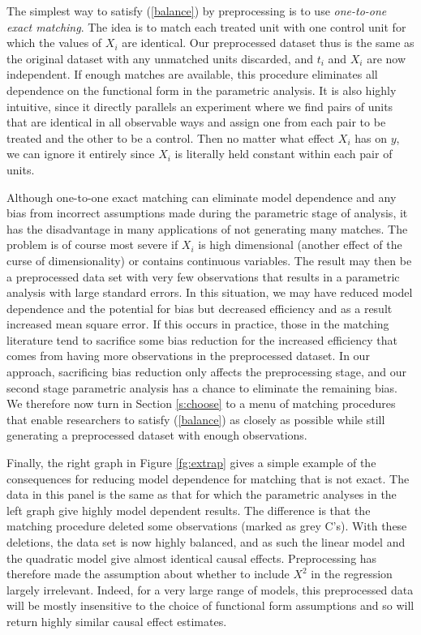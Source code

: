 \documentclass[11pt,titlepage]{article}
\begin{document}
The simplest way to satisfy (\ref{balance}) by preprocessing is to use
\emph{one-to-one exact matching}.  The idea is to match each treated
unit with one control unit for which the values of $X_i$ are
identical.  Our preprocessed dataset thus is the same as the original
dataset with any unmatched units discarded, and $t_i$ and $X_i$ are
now independent.  If enough matches are available, this procedure
eliminates all dependence on the functional form in the parametric
analysis.  It is also highly intuitive, since it directly parallels an
experiment where we find pairs of units that are identical in all
observable ways and assign one from each pair to be treated and the
other to be a control.  Then no matter what effect $X_i$ has on $y$,
we can ignore it entirely since $X_i$ is literally held constant
within each pair of units.

Although one-to-one exact matching can eliminate model dependence and
any bias from incorrect assumptions made during the parametric stage
of analysis, it has the disadvantage in many applications of not
generating many matches.  The problem is of course most severe if
$X_i$ is high dimensional (another effect of the curse of
dimensionality) or contains continuous variables.  The result may then
be a preprocessed data set with very few observations that results in
a parametric analysis with large standard errors.  In this situation,
we may have reduced model dependence and the potential for bias but
decreased efficiency and as a result increased mean square error.  If
this occurs in practice, those in the matching literature tend to
sacrifice some bias reduction for the increased efficiency that comes
from having more observations in the preprocessed dataset.  In our
approach, sacrificing bias reduction only affects the preprocessing
stage, and our second stage parametric analysis has a chance to
eliminate the remaining bias.  We therefore now turn in Section
\ref{s:choose} to a menu of matching procedures that enable researchers
to satisfy (\ref{balance}) as closely as possible while still
generating a preprocessed dataset with enough observations.

Finally, the right graph in Figure \ref{fg:extrap} gives a simple
example of the consequences for reducing model dependence for matching
that is not exact.  The data in this panel is the same as that for
which the parametric analyses in the left graph give highly model
dependent results.  The difference is that the matching procedure
deleted some observations (marked as grey C's).  With these deletions,
the data set is now highly balanced, and as such the linear model and
the quadratic model give almost identical causal effects.
Preprocessing has therefore made the assumption about whether to
include $X^2$ in the regression largely irrelevant.  Indeed, for a
very large range of models, this preprocessed data will be mostly
insensitive to the choice of functional form assumptions and so will
return highly similar causal effect estimates.
\end{document}
